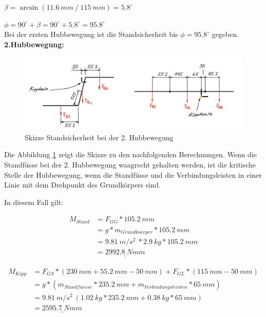 \({\beta} = \arcsin{(11.6\ mm\ /\ 115\ mm)} = 5.8^{\circ} \)

\({\phi} = 90^{\circ} + {\beta} = 90^{\circ} + 5.8^{\circ} = 95.8^{\circ} \)\\

Bei der ersten Hubbewegung ist die Standsicherheit bis \({\phi} = 95.8^\circ\) gegeben.
\\


\textbf{2.Hubbewegung:}
\begin{figure}[H]
  \includegraphics[width=1\textwidth]{img/Treppensteigen/Standsicherheit 2.Hub.png}
  \centering
  \caption{Skizze Standsicherheit bei der 2. Hubbewegung}
  \label{fig:standsicherheit-2-hubbewegung}
\end{figure}

Die Abbildung \ref{fig:standsicherheit-2-hubbewegung} zeigt die Skizze zu den nachfolgenden Berechnungen. Wenn die Standfüsse bei der 2. Hubbewegung waagrecht gehalten werden, ist die kritische Stelle der Hubbewegung, wenn die Standfüsse und die Verbindungsleisten in einer Linie mit dem Drehpunkt des Grundkörpers sind.

In diesem Fall gilt:

\begin{align*}
    M_{Stand} &= F_{GG} * 105.2\ mm \\
    &= g * m_{Grundkoerper} * 105.2\ mm \\
    &= 9.81\ m/s^2\ * 2.9\ kg * 105.2\ mm \\
    &= \underline{\underline{2992.8\ Nmm}}
\end{align*}

\begin{align*}
    M_{Kipp}  &= F_{GS} * (230\ mm + 55.2\ mm - 50\ mm) + F_{GL} * (115\ mm - 50\ mm) \\
    &= g * (m_{Standfuesse} * 235.2\ mm + m_{Verbindungsleisten} * 65\ mm) \\
    &= 9.81\ m/s^2\ (1.02\ kg * 235.2\ mm + 0.38\ kg * 65\ mm) \\
    &= \underline{\underline{2595.7\ Nmm}}
\end{align*}
  
